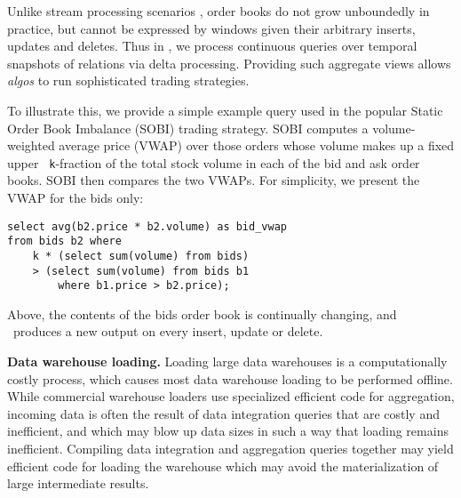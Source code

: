 
Unlike stream processing scenarios \cite{abadi-vldbj:03,motwani-cidr:03}, order
books do not grow unboundedly in practice, but cannot be expressed by windows
given their arbitrary inserts, updates and deletes. Thus in \compiler, we
process continuous queries over temporal snapshots of relations via delta
processing.  Providing such aggregate views allows {\em algos}\/ to run
sophisticated trading strategies. 

To illustrate this, we provide a simple example query used in the popular Static
Order Book Imbalance (SOBI) trading strategy. SOBI computes a volume-weighted
average price (VWAP) over those orders whose volume makes up a fixed upper {\tt
k}-fraction of the total stock volume in each of the bid and ask order
books. SOBI then compares the two VWAPs. For simplicity, we present the VWAP for
the bids only:

\begin{Verbatim}
select avg(b2.price * b2.volume) as bid_vwap
from bids b2 where
    k * (select sum(volume) from bids)
    > (select sum(volume) from bids b1
        where b1.price > b2.price);
\end{Verbatim}
%
Above, the contents of the bids order book is continually changing, and
\compiler\ produces a new output on every insert, update or delete.


\textbf{Data warehouse loading.}  Loading large data warehouses is a
computationally costly process, which causes most data warehouse loading to be
performed offline.  While commercial warehouse loaders use specialized efficient
code for aggregation, incoming data is often the result of data integration
queries that are costly and inefficient, and which may blow up data sizes in
such a way that loading remains inefficient.  Compiling data integration and
aggregation queries together may yield efficient code for loading the warehouse
which may avoid the materialization of large intermediate results.

